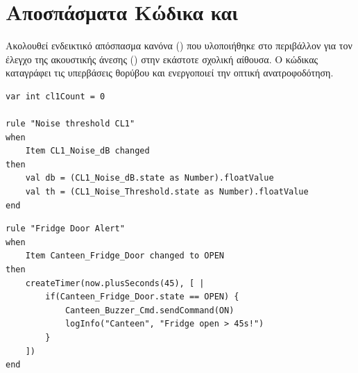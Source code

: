 \chapter{Αποσπάσματα Κώδικα και }

Ακολουθεί ενδεικτικό απόσπασμα κανόνα () που υλοποιήθηκε στο περιβάλλον  για τον έλεγχο της
ακουστικής άνεσης () στην εκάστοτε σχολική αίθουσα. Ο κώδικας καταγράφει τις υπερβάσεις θορύβου και
ενεργοποιεί την οπτική ανατροφοδότηση.

\begin{lstlisting}[caption={Listing Γ.1: Ενδεικτικός κανόνας NoiseGuard σε openHAB},label={lst:noiseguard_rule}]
var int cl1Count = 0

rule "Noise threshold CL1"
when
    Item CL1_Noise_dB changed
then
    val db = (CL1_Noise_dB.state as Number).floatValue
    val th = (CL1_Noise_Threshold.state as Number).floatValue
end
\end{lstlisting}

\begin{lstlisting}[caption={Listing Γ.2: Ενδεικτικός κανόνας FridgeGuardian σε openHAB},label={lst:fridgeguardian_rule}]
rule "Fridge Door Alert"
when
    Item Canteen_Fridge_Door changed to OPEN
then
    createTimer(now.plusSeconds(45), [ |
        if(Canteen_Fridge_Door.state == OPEN) {
            Canteen_Buzzer_Cmd.sendCommand(ON)
            logInfo("Canteen", "Fridge open > 45s!")
        }
    ])
end
\end{lstlisting}


